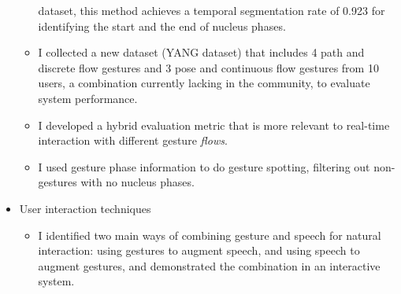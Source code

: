 \begin{itemize}
\begin{itemize}
    dataset, this method achieves a temporal segmentation rate of 0.923 for
    identifying the start and the end of nucleus phases.
    \item I collected a new dataset (YANG dataset) that includes 4 path and discrete flow gestures and 3 pose and
    continuous flow gestures from 10 users, a combination currently
    lacking in the community, to evaluate system performance.
    \item I developed a hybrid evaluation metric that is more relevant to
    real-time interaction with different gesture \textit{flows}.
    \item I used gesture phase information to do gesture spotting, filtering out
non-gestures with no nucleus phases.
  \end{itemize}
  \item User interaction techniques
  \begin{itemize}
  \item I identified two main ways of combining gesture and speech for natural
  interaction: using gestures to augment speech, and using speech to augment
  gestures, and demonstrated the combination in an interactive system.
  \end{itemize}
\end{itemize}
